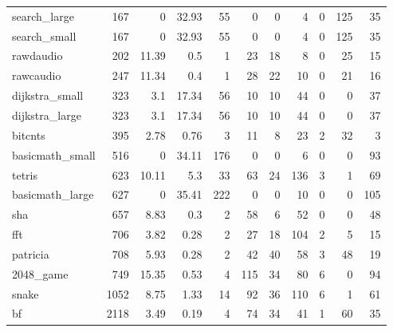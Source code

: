 \begin{tabular}{lrrrrrrrrrr}
 search\_large    &            167 &     0    &  32.93 &   55 &      0 &          0 &            4 &     0 &   125 &    35 \\
 search\_small    &            167 &     0    &  32.93 &   55 &      0 &          0 &            4 &     0 &   125 &    35 \\
 rawdaudio       &            202 &    11.39 &   0.5  &    1 &     23 &         18 &            8 &     0 &    25 &    15 \\
 rawcaudio       &            247 &    11.34 &   0.4  &    1 &     28 &         22 &           10 &     0 &    21 &    16 \\
 dijkstra\_small  &            323 &     3.1  &  17.34 &   56 &     10 &         10 &           44 &     0 &     0 &    37 \\
 dijkstra\_large  &            323 &     3.1  &  17.34 &   56 &     10 &         10 &           44 &     0 &     0 &    37 \\
 bitcnts         &            395 &     2.78 &   0.76 &    3 &     11 &          8 &           23 &     2 &    32 &     3 \\
 basicmath\_small &            516 &     0    &  34.11 &  176 &      0 &          0 &            6 &     0 &     0 &    93 \\
 tetris          &            623 &    10.11 &   5.3  &   33 &     63 &         24 &          136 &     3 &     1 &    69 \\
 basicmath\_large &            627 &     0    &  35.41 &  222 &      0 &          0 &           10 &     0 &     0 &   105 \\
 sha             &            657 &     8.83 &   0.3  &    2 &     58 &          6 &           52 &     0 &     0 &    48 \\
 fft             &            706 &     3.82 &   0.28 &    2 &     27 &         18 &          104 &     2 &     5 &    15 \\
 patricia        &            708 &     5.93 &   0.28 &    2 &     42 &         40 &           58 &     3 &    48 &    19 \\
 2048\_game       &            749 &    15.35 &   0.53 &    4 &    115 &         34 &           80 &     6 &     0 &    94 \\
 snake           &           1052 &     8.75 &   1.33 &   14 &     92 &         36 &          110 &     6 &     1 &    61 \\
 bf              &           2118 &     3.49 &   0.19 &    4 &     74 &         34 &           41 &     1 &    60 &    35 \\

\end{tabular}
